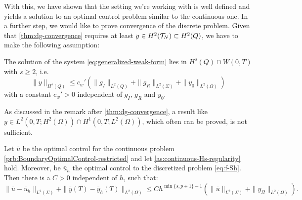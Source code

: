 \documentclass[../thesis.tex]{subfiles}
\begin{document}
With this, we have shown that the setting we're working with is well defined and yields a solution to an optimal control problem similar to the continuous one.
In a further step, we would like to prove convergence of the discrete problem.
Given that \cref{thm:dg-convergence} requires at least $y \in H^2(\mathcal{T}_N) \subset H^2(Q)$, we have to make the following assumption:
\begin{assumption}
\label{as:continuous-Hs-regularity}
The solution of the system \cref{eq:generalized-weak-form} lies in $H^s(Q) \cap W(0,T)$ with $s \geq 2$, i.e.
\[
	\| y \|_{H^s(Q)} \leq c_w' \left( \| g_I \|_{L^2(Q)} + \| g_R \|_{L^2(\Sigma)} + \| y_0 \|_{L^2(\Omega)} \right)
\]
with a constant $c_w' > 0$ independent of $g_I$, $g_R$ and $y_0$.
\end{assumption}
As discussed in the remark after \cref{thm:dg-convergence}, a result like $y \in L^2(0, T; H^2(\Omega)) \cap H^1(0, T; L^2(\Omega))$, which often can be proved, is not sufficient.
\begin{theorem}
\label{thm:optimal-control-convergence}
Let $\bar{u}$ be the optimal control for the continuous problem \cref{prb:BoundaryOptimalControl-restricted} and let \cref{as:continuous-Hs-regularity} hold. Moreover, be $\bar{u}_h$ the optimal control to the discretized problem \cref{eq:f-Sh}.
Then there is a $C > 0$ independent of $h$, such that:
\[
	\| \bar{u} - \bar{u}_h \|_{L^2(\Sigma)} + \| \bar{y}(T) - \bar{y}_h(T) \|_{L^2(\Omega)} \leq C h^{\min \{ s, p+1\} - 1} \left( \| \bar{u} \|_{L^2(\Sigma)} + \| y_\Omega \|_{L^2(\Omega)} \right).
\]
\end{theorem}
\end{document}

